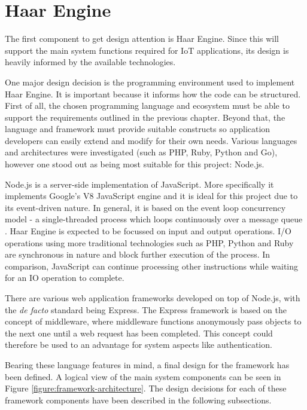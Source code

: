   \section{Haar Engine}
    The first component to get design attention is Haar Engine. Since this will support the main system functions required for IoT applications, its design is heavily informed by the available technologies.

    One major design decision is the programming environment used to implement Haar Engine. It is important because it informs how the code can be structured. First of all, the chosen programming language and ecosystem must be able to support the requirements outlined in the previous chapter. Beyond that, the language and framework must provide suitable constructs so application developers can easily extend and modify for their own needs. Various languages and architectures were investigated (such as PHP, Ruby, Python and Go), however one stood out as being most suitable for this project: Node.js.

    Node.js is a server-side implementation of JavaScript. More specifically it implements Google's V8 JavaScript engine and it is ideal for this project due to its event-driven nature. In general, it is based on the event loop concurrency model - a single-threaded process which loops continuously over a message queue \citep{event-loop}. Haar Engine is expected to be focussed on input and output operations. I/O operations using more traditional technologies such as PHP, Python and Ruby are synchronous in nature and block further execution of the process. In comparison, JavaScript can continue processing other instructions while waiting for an IO operation to complete.

    There are various web application frameworks developed on top of Node.js, with the \textit{de facto} standard being Express. The Express framework is based on the concept of middleware, where middleware functions anonymously pass objects to the next one until a web request has been completed. This concept could therefore be used to an advantage for system aspects like authentication.

    Bearing these language features in mind, a final design for the framework has been defined. A logical view of the main system components can be seen in Figure \ref{figure:framework-architecture}. The design decisions for each of these framework components have been described in the following subsections.

